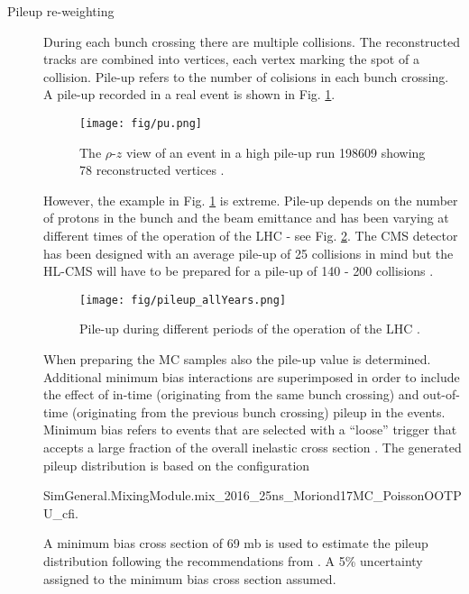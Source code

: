 \begin{description}

\item[Pileup re-weighting]

During each bunch crossing there are multiple \Pp\Pp collisions. The reconstructed tracks are combined into vertices, each vertex marking the spot of a \Pp\Pp collision. Pile-up refers to the number of \Pp\Pp colisions in each bunch crossing. A pile-up recorded in a real event is shown in Fig. \ref{fig:pu}.

\begin{figure}[htp]
\centering
\texttt{[image: fig/pu.png]}
\caption{The $\rho$-$z$ view of an event in a high pile-up run 198609 showing 78 reconstructed vertices \cite{Holzner:pu}.}
\label{fig:pu}
\end{figure}

However, the example in Fig. \ref{fig:pu} is extreme. Pile-up depends on the number of protons in the bunch and the beam emittance and has been varying at different times of the operation of the LHC - see Fig. \ref{fig:pileup_allYears}. The CMS detector has been designed with an average pile-up of 25 collisions in mind but the HL-CMS will have to be prepared for a pile-up of 140 - 200 collisions \cite{Apollinari:2015bam}.

\begin{figure}[htp]
\centering
\texttt{[image: fig/pileup\_allYears.png]}
\caption{Pile-up during different periods of the operation of the LHC \cite{twiki:pu_public}.}
\label{fig:pileup_allYears}
\end{figure}

When preparing the MC samples also the pile-up value is determined. Additional minimum bias interactions are superimposed in order to include the effect of in-time (originating from the same bunch crossing) and out-of-time (originating from the previous bunch crossing) pileup in the events. Minimum bias refers to events that are selected with a “loose” trigger that accepts a large fraction of the overall inelastic cross section \cite{Field:2011iq}. The generated pileup distribution is based on the configuration

SimGeneral.MixingModule.mix\_2016\_25ns\_Moriond17MC\_PoissonOOTPU\_cfi.

A minimum bias cross section of 69 mb is used to estimate the pileup distribution following the recommendations from \cite{twiki:pileup}. A 5\% uncertainty assigned to the minimum bias cross section assumed.


\end{description}
